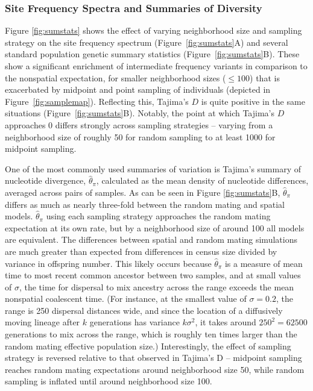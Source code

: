 \documentclass[11pt,twoside,lineno]{preprint}
\newif\ifcomments
\newcommand{\plr}[1]{\ifcomments{{\color{purple} \it (#1)}}\else{}\fi}
\begin{document}
\subsubsection{Site Frequency Spectra and Summaries of Diversity}

Figure \ref{fig:sumstats} shows the effect of varying neighborhood size and sampling strategy on the site frequency spectrum (Figure~\ref{fig:sumstats}A) 
and several standard population genetic summary statistics (Figure~\ref{fig:sumstats}B). 
These show a significant enrichment of intermediate frequency variants in comparison to the nonspatial expectation,
for smaller neighborhood sizes ($\leq 100$) that is exacerbated by midpoint and point sampling of individuals (depicted in Figure~\ref{fig:samplemap}). 
Reflecting this, Tajima's $D$ is quite positive in the same situations (Figure~\ref{fig:sumstats}B).
Notably, the point at which Tajima's $D$ approaches 0 differs strongly across sampling strategies 
-- varying from a neighborhood size of roughly 50 for random sampling to at least 1000 for midpoint sampling. 

One of the most commonly used summaries of variation is Tajima's summary of nucleotide divergence, $\widehat{\theta}_{\pi}$,
\plr{In the figure this has no hat on; should we remove these in the text? The notation is not standard.}
calculated as the mean density of nucleotide differences, averaged across pairs of samples.
As can be seen in Figure \ref{fig:sumstats}B, $\widehat{\theta}_{\pi}$ differs as much as nearly three-fold 
between the random mating and spatial models.
$\widehat{\theta}_{\pi}$ using each sampling strategy approaches the random mating expectation at its own rate, 
but by a neighborhood size of around 100 all models are equivalent. 
\plr{To interpret this we need to compare to census size over variance in offspring number.}
The differences between spatial and random mating simulations are much greater than expected 
from differences in census size divided by variance in offspring number.
This likely occurs because $\widehat{\theta}_{\pi}$ is a measure of mean time to most recent common ancestor between two samples,
and at small values of $\sigma$, the time for dispersal to mix ancestry across the range exceeds the mean nonspatial coalescent time.
(For instance, at the smallest value of $\sigma=0.2$, the range is 250 dispersal distances wide,
and since the location of a diffusively moving lineage after $k$ generations has variance $k \sigma^2$, 
it takes around $250^2 = 62500$ generations to mix across the range,
which is roughly ten times larger than the random mating effective population size.)
Interestingly, the effect of sampling strategy is reversed relative to that observed in Tajima's D 
-- midpoint sampling reaches random mating expectations around neighborhood size 50, 
while random sampling is inflated until around neighborhood size 100. 
\end{document}
